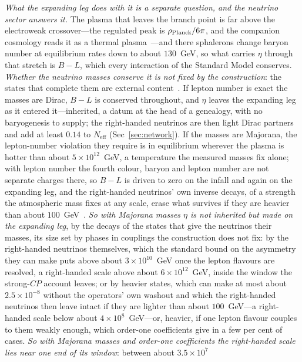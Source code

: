 \documentclass[11pt,a4paper]{article}
\theoremstyle{plain}
\theoremstyle{definition}
\theoremstyle{remark}
\begin{document}
\emph{What the expanding leg does with it is a separate question, and the neutrino sector answers it.} The
plasma that leaves the branch point is far above the electroweak crossover---the regulated peak is
$\rho_{\rm Planck}/6\pi$, and the companion cosmology reads it as a thermal plasma~\cite{JanzenCRcosmology}---and
there sphalerons change baryon number at equilibrium rates down to about $130$~GeV, so what carries $\eta$
through that stretch is $B-L$, which every interaction of the Standard Model conserves. \emph{Whether the
neutrino masses conserve it is not fixed by the construction}: the states that complete them are external
content~\cite{JanzenMatter}. If lepton number is exact the masses are Dirac, $B-L$ is conserved throughout, and
$\eta$ leaves the expanding leg as it entered it---inherited, a datum at the head of a genealogy, with no
baryogenesis to supply; the right-handed neutrinos are then light Dirac partners and add at least $0.14$ to
$N_{\mathrm{eff}}$ (Sec~\ref{sec:network}). If the masses are Majorana, the lepton-number violation they require is
in equilibrium wherever the plasma is hotter than about $5\times10^{12}$~GeV, a temperature the measured masses
fix alone; with lepton number the fourth colour, baryon and lepton number are not separate charges there, so
$B-L$ is driven to zero on the infall and again on the expanding leg, and the right-handed neutrinos' own
inverse decays, of a strength the atmospheric mass fixes at any scale, erase what survives if they are heavier
than about $100$~GeV~\cite{JanzenMatter}. \emph{So with Majorana masses $\eta$ is not inherited but made on the
expanding leg}, by the decays of the states that give the neutrinos their masses, its size set by phases in
couplings the construction does not fix: by the right-handed neutrinos themselves, which the standard bound on
the asymmetry they can make puts above about $3\times10^{10}$~GeV once the lepton flavours are resolved, a
right-handed scale above about $6\times10^{12}$~GeV, inside the window the strong-$CP$ account leaves; or by
heavier states, which can make at most about $2.5\times10^{-8}$ without the operators' own washout and which the
right-handed neutrinos then leave intact if they are lighter than about $100$~GeV---a right-handed scale below
about $4\times10^{8}$~GeV---or, heavier, if one lepton flavour couples to them weakly enough, which order-one
coefficients give in a few per cent of cases. \emph{So with Majorana masses and
order-one coefficients the right-handed scale lies near one end of its window}: between about $3.5\times10^{7}$
\end{document}

